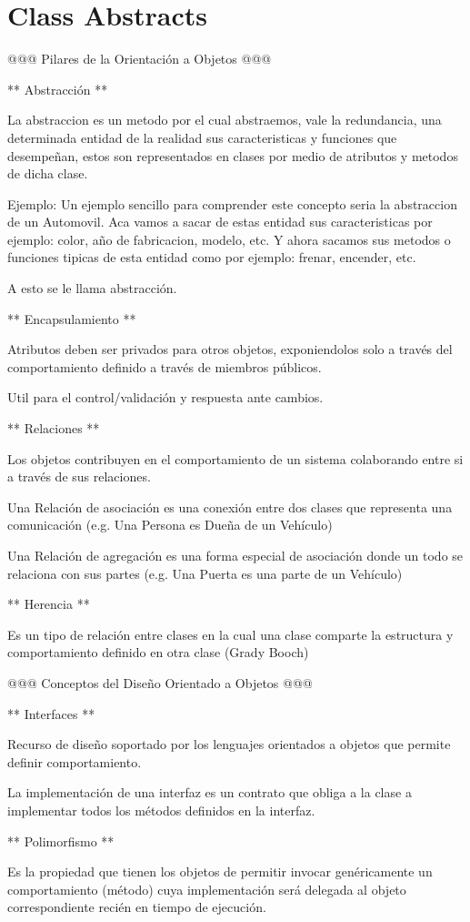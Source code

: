 \section{Class Abstracts}

@@@ Pilares de la Orientación a Objetos @@@

** Abstracción **

La abstraccion es un metodo por el cual abstraemos, vale la redundancia, una determinada entidad de la realidad sus caracteristicas y funciones que desempeñan, estos son representados en clases por medio de atributos y metodos de dicha clase. 

Ejemplo: Un ejemplo sencillo para comprender este concepto seria la abstraccion de un Automovil. Aca vamos a sacar de estas entidad sus caracteristicas por ejemplo: color, año de fabricacion, modelo, etc. Y ahora sacamos sus metodos o funciones tipicas de esta entidad como por ejemplo: frenar, encender, etc. 

A esto se le llama abstracción.


** Encapsulamiento ** 

Atributos deben ser privados para otros objetos, exponiendolos solo a través del comportamiento definido a través de miembros públicos.

Util para el control/validación y respuesta ante cambios.

** Relaciones **

Los objetos contribuyen en el comportamiento de un sistema  colaborando entre si  a través de sus relaciones.

Una Relación de asociación es una conexión entre dos clases que representa una comunicación (e.g. Una Persona es Dueña de un Vehículo)

Una Relación de  agregación es una forma especial de asociación donde un todo se relaciona con sus partes (e.g. Una Puerta es una parte de un Vehículo)

** Herencia **

Es un tipo de relación entre clases en la cual una clase comparte la estructura y comportamiento definido en otra clase (Grady Booch)

@@@ Conceptos del Diseño Orientado a Objetos  @@@

** Interfaces **

Recurso de diseño soportado por los lenguajes orientados a objetos que permite definir comportamiento.

La implementación de una interfaz es un contrato que obliga a la clase a implementar todos los métodos definidos en la interfaz.


** Polimorfismo **

Es la propiedad que tienen los objetos de permitir invocar genéricamente un comportamiento (método) cuya implementación será delegada al objeto correspondiente recién en tiempo de ejecución.


